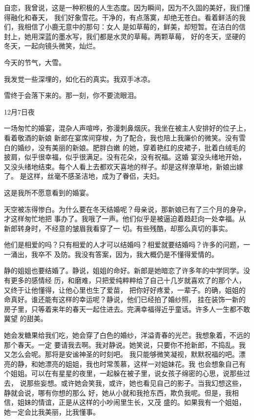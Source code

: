 		自恋，我曾说，这是一种积极的人生态度。因为瞬间，因为不久固的美好，我们懂得融化和春天，
	我们好象雪花。干净的，有点落寞，却绝无苍白。看着鲜活的我们，我相信了小鹿无意中的那句：女人
	是如草莓的，鲜美，却短暂。在洁白的信封上，她用深蓝的墨水写，我们都是水灵的草莓。两颗草莓，
	好的冬天，坚硬的冬天，一起向镜头微笑，灿烂。


		今天的节气，大雪。

		我发觉一些深埋的，如化石的真实。我双手冰凉。

		雪终于会落下来的。那一刻，你不要流眼泪。

		12月7日夜

	\endwriting



		一场匆忙的婚宴，混杂人声喧哗，弥漫刺鼻烟灰。我坐在被主人安排好的位子上，看着敬酒的新娘
	新郎在宴席间穿梭，为了配合，我也陪上我廉价的微笑。没有雪白的婚纱，没有美丽的新娘。肥胖白嫩
	的她，穿着艳红的皮裙子，批着白绒毛的披肩，似乎很幸福，似乎很满足。没有花朵，没有祝福。这婚
	宴没头绪地开始，又没头绪地结束。每个人看上去都欢天喜地的样子。却是这样潦草地，新娘出嫁了。
	是这样，丝毫不感圣洁地，成为了眷侣，夫妇。


		这是我所不愿意看到的婚宴。


		天空被冻得惨白。为什么要在冬天结婚呢？母亲说，那新娘已有了三个月的身孕，才这样匆忙地把
	事办了。我哦了一声。他们似乎是被逼迫着趋赶向一处幸福。从新郎转身时，不经意的皱眉我看穿了一
	切。有些残酷，却那么真切的事实。

		他们是相爱的吗？只有相爱的人才可以结婚吗？相爱就要结婚吗？许多的问题，一一涌出，我卒不
	及防。我没有答案，因为，我大概仍是不懂得爱情的。


		静的姐姐也要结婚了。静说，姐姐的命好。新郎是她暗恋了许多年的中学同学。没有更多的感情经
	历，和磨难，只把爱纯粹粹给了自己十几岁就喜欢了的那个人，又终于让他懂得，让他心里也生了爱苗，
	把你好好疼爱，一辈子。的确，姐姐的命真好。谁还能有这样的幸运呢？静说，他们已经拍了婚纱照，
	挂在装饰一新的房子里，只等着来年的春天一起住进去。完满幸福得近乎童话。许多人一生都不敢冀望
	的甜美。


		她会发糖果给我们吃，她会穿了白色的婚纱，洋溢青春的光芒。我想象着，不远的那个春天。一定
	要请我去啊。我对静说。她笑说，只要你不抢新郎，不捣乱。我又怎么会呢。那将是安谧神圣的时刻吧。
	我只能够微笑凝视，默默祝福的吧。漂亮的静，和她漂亮的姐姐，我也时常羡慕，这样一对姐妹花。我
	也会想象自己有个姐姐。可以在有星星的夜里，一起躲在被子里，说女孩子绵密的心思，说那些过去，
	说那些妄想。或许她会笑我，或许，她也看见自己的影子。当我幻想这些，静就会说，哪有你想的那么
	好，她从小就和我抢东西，欺负我呢。但是，我相信，姐妹的情谊，正是从这样的小吵闹里生长，又茂
	盛的。如果我有一个姐姐，她一定会比我美丽，比我懂事。


